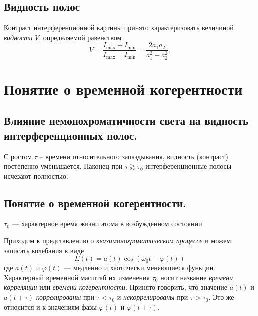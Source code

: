 \documentclass[a4paper, 12pt]{book}
\begin{document}
	\section{Видность полос}
	Контраст интерференционной картины принято характеризовать величиной \textit{видности} $V$, определяемой равенством
	\begin{equation}
		V=\frac{I_{\max}-I_{\min}}{I_{\max}+I_{\min}}=\frac{2a_1a_2}{a_1^2+a_2^2}.
	\end{equation}
	\chapter{Понятие о временной когерентности}
	\section{Влияние немонохроматичности света на видность интерференционных полос.}
	С ростом $\tau$ – времени относительного запаздывания, видность (контраст) постепенно уменьшается. Наконец при $\tau\gtrsim\tau_0$ интерференционные полосы исчезают полностью.
	\section{Понятие о временной когерентности.}
	$\tau_0$ — характерное время жизни атома в возбужденном состоянии.\par
	Приходим к представлению о \textit{квазимонохроматическом процессе} и можем записать колебания в виде
	\begin{equation*}
		E\left(t\right)=a\left(t\right)\cos\left(\omega_0t-\varphi\left(t\right)\right)
	\end{equation*}
	где $a\left(t\right)$ и $\varphi\left(t\right)$ — медленно и хаотически меняющиеся функции. Характерный временной масштаб их изменения $\tau_0$ носит название \textit{времени корреляции} или \textit{времени когерентности}. Принято говорить, что значение $a\left(t\right)$ и $a\left(t+\tau\right)$ \textit{коррелированы} при $\tau<\tau_0$ и \textit{некоррелированы} при $\tau>\tau_0$. Это же относится и к значениям фазы $\varphi\left(t\right)$ и $\varphi\left(t+\tau\right)$.
\end{document}
